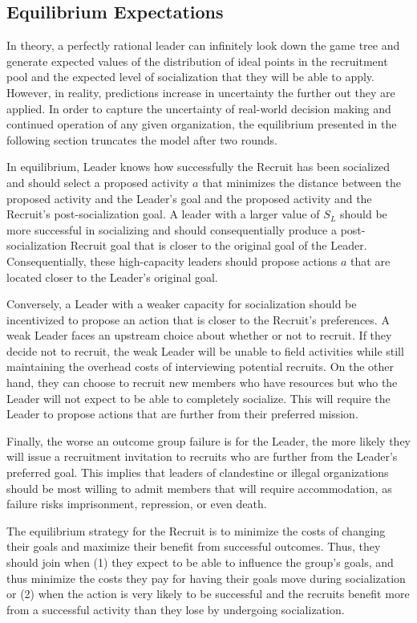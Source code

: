 \subsection{Equilibrium Expectations}

In theory, a perfectly rational leader can infinitely look down the game tree and generate expected values of the distribution of ideal points in the recruitment pool and the expected level of socialization that they will be able to apply. However, in reality, predictions increase in uncertainty the further out they are applied. In order to capture the uncertainty of real-world decision making and continued operation of any given organization, the equilibrium presented in the following section truncates the model after two rounds.

In equilibrium, Leader knows how successfully the Recruit has been socialized and should select a proposed activity $a$ that minimizes the distance between the proposed activity and the Leader's goal and the proposed activity and the Recruit's post-socialization goal. A leader with a larger value of $S_{L}$ should be more successful in socializing and should consequentially produce a post-socialization Recruit goal that is closer to the original goal of the Leader. Consequentially, these high-capacity leaders should propose actions $a$ that are located closer to the Leader's original goal.  

Conversely, a Leader with a weaker capacity for socialization should be incentivized to propose an action that is closer to the Recruit's preferences. A weak Leader faces an upstream choice about whether or not to recruit. If they decide not to recruit, the weak Leader will be unable to field activities while still maintaining the overhead costs of interviewing potential recruits. On the other hand, they can choose to recruit new members who have resources but who the Leader will not expect to be able to completely socialize. This will require the Leader to propose actions that are further from their preferred mission. 

Finally, the worse an outcome group failure is for the Leader, the more likely they will issue a recruitment invitation to recruits who are further from the Leader's preferred goal.  This implies that leaders of clandestine or illegal organizations should be most willing to admit members that will require accommodation, as failure risks imprisonment, repression, or even death.

The equilibrium strategy for the Recruit is to minimize the costs of changing their goals and maximize their benefit from successful outcomes. Thus, they should join when (1) they expect to be able to influence the group's goals, and thus minimize the costs they pay for having their goals move during socialization or (2) when the action is very likely to be successful and the recruits benefit more from a successful activity than they lose by undergoing socialization.  

